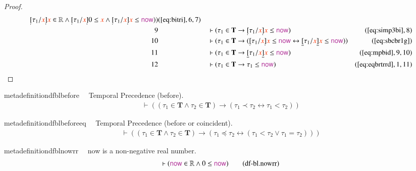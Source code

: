 \begin{proof}
\begin{align}
      \underaccent{\dot}{[} \tau_1 / \msc{x}
      \underaccent{\dot}{]} \msc{x} \in \mathbb{R} \wedge
      \underaccent{\dot}{[} \tau_1 / \msc{x}
      \underaccent{\dot}{]} 0 \le \msc{x} \wedge
      \underaccent{\dot}{[} \tau_1 / \msc{x}
      \underaccent{\dot}{]} \msc{x} \le \mathsf{\mc{now}} )
      )&(\mbox{\ref{eq:bitri}},6,7)\notag
  \\ 9 &&  & \vdash ( \tau_1 \in \mathbf{T} \rightarrow \underaccent{\dot}{[}
      \tau_1 / \msc{x} \underaccent{\dot}{]} \msc{x} \le
      \mathsf{\mc{now}} )&(\mbox{\ref{eq:simp3bi}},8)\notag
  \\ 10 &&  & \vdash ( \tau_1 \in \mathbf{T} \rightarrow (
      \underaccent{\dot}{[} \tau_1 / \msc{x}
      \underaccent{\dot}{]} \msc{x} \le \mathsf{\mc{now}}
      \leftrightarrow \underline{[} \tau_1 / \msc{x}
      \underline{]} \msc{x} \le \mathsf{\mc{now}} )
      )&(\mbox{\ref{eq:sbcbr1g}})\notag
  \\ 11 &&  & \vdash ( \tau_1 \in \mathbf{T} \rightarrow \underline{[} \tau_1 /
      \msc{x} \underline{]} \msc{x} \le \mathsf{\mc{now}}
      )&(\mbox{\ref{eq:mpbid}},9,10)\notag
  \\ 12 &&  & \vdash ( \tau_1 \in \mathbf{T} \rightarrow \tau_1 \le
      \mathsf{\mc{now}}
      )&(\mbox{\ref{eq:eqbrtrrd}},1,11)\notag
\end{align}
\end{proof}

\begin{restatable}{metadefinition}{dfblbefore}~~ Temporal Precedence (before).
\begin{align}
\vdash ( ( \tau_1 \in \mathbf{T} \wedge \tau_2 \in \mathbf{T} ) \rightarrow (
    \tau_1 \prec \tau_2 \leftrightarrow \tau_1 < \tau_2 )
    )\label{eq:df-bl.before}\tag{df-bl.before}
\end{align}
\end{restatable}

\begin{restatable}{metadefinition}{dfblbeforeeq}~~ Temporal Precedence (before or
coincident).
\begin{align}
\vdash ( ( \tau_1 \in \mathbf{T} \wedge \tau_2 \in \mathbf{T} ) \rightarrow (
    \tau_1 \preccurlyeq \tau_2 \leftrightarrow ( \tau_1 < \tau_2 \vee \tau_1 =
    \tau_2 ) ) )\label{eq:df-bl.beforeeq}\tag{df-bl.beforeeq}
\end{align}
\end{restatable}

\begin{restatable}{metadefinition}{dfblnowrr}~~ now is a non-negative real number.
\begin{align}
\vdash ( \mathsf{\mc{now}} \in \mathbb{R} \wedge 0 \le \mathsf{\mc{now}}
    )\label{eq:df-bl.nowrr}\tag{df-bl.nowrr}
\end{align}
\end{restatable}

